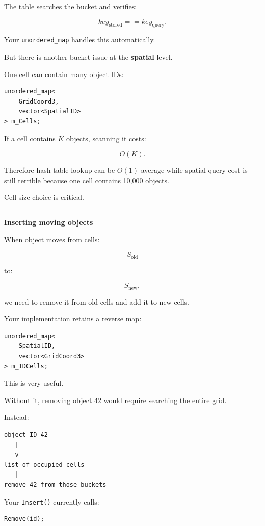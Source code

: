 The table searches the bucket and verifies:

\[
key_{\text{stored}}==key_{\text{query}}.
\]

Your \texttt{unordered\_map} handles this automatically.

But there is another bucket issue at the \textbf{spatial} level.

One cell can contain many object IDs:

\begin{verbatim}
unordered_map<
    GridCoord3,
    vector<SpatialID>
> m_Cells;
\end{verbatim}

If a cell contains \(K\) objects, scanning it costs:

\[
O(K).
\]

Therefore hash-table lookup can be \(O(1)\) average while spatial-query cost is still terrible because one cell contains 10,000 objects.

Cell-size choice is critical.

\begin{center}\rule{0.5\linewidth}{0.5pt}\end{center}

\textbf{Inserting moving objects}

When object moves from cells:

\[
S_{\text{old}}
\]

to:

\[
S_{\text{new}},
\]

we need to remove it from old cells and add it to new cells.

Your implementation retains a reverse map:

\begin{verbatim}
unordered_map<
    SpatialID,
    vector<GridCoord3>
> m_IDCells;
\end{verbatim}

This is very useful.

Without it, removing object 42 would require searching the entire grid.

Instead:

\begin{verbatim}
object ID 42
   |
   v
list of occupied cells
   |
remove 42 from those buckets
\end{verbatim}

Your \texttt{Insert()} currently calls:

\begin{verbatim}
Remove(id);
\end{verbatim}

